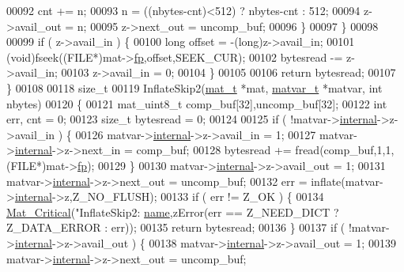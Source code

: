 \begin{DoxyCode}
{{00092             cnt         += n;
00093             n            = ((nbytes-cnt)<512) ? nbytes-cnt : 512;
00094             z->avail\_out = n;
00095             z->next\_out  = uncomp\_buf;
00096         \}
00097     \}
00098 
00099     \textcolor{keywordflow}{if} ( z->avail\_in ) \{
00100         \textcolor{keywordtype}{long} offset = -(long)z->avail\_in;
00101         (\textcolor{keywordtype}{void})fseek((FILE*)mat->\hyperlink{struct__mat__t_a85f562e407ca9ad4d2a6e14f839432b7}{fp},offset,SEEK\_CUR);
00102         bytesread -= z->avail\_in;
00103         z->avail\_in = 0;
00104     \}
00105 
00106     \textcolor{keywordflow}{return} bytesread;
00107 \}
00108 
00118 \textcolor{keywordtype}{size\_t}
00119 InflateSkip2(\hyperlink{struct__mat__t}{mat\_t} *mat, \hyperlink{group___m_a_t_structmatvar__t}{matvar\_t} *matvar, \textcolor{keywordtype}{int} nbytes)
00120 \{
00121     mat\_uint8\_t comp\_buf[32],uncomp\_buf[32];
00122     \textcolor{keywordtype}{int}    err, cnt = 0;
00123     \textcolor{keywordtype}{size\_t} bytesread = 0;
00124 
00125     \textcolor{keywordflow}{if} ( !matvar->\hyperlink{group___m_a_t_a6e97e3ed9f40c49322c18561c2a94e92}{internal}->z->avail\_in ) \{
00126         matvar->\hyperlink{group___m_a_t_a6e97e3ed9f40c49322c18561c2a94e92}{internal}->z->avail\_in = 1;
00127         matvar->\hyperlink{group___m_a_t_a6e97e3ed9f40c49322c18561c2a94e92}{internal}->z->next\_in = comp\_buf;
00128         bytesread += fread(comp\_buf,1,1,(FILE*)mat->\hyperlink{struct__mat__t_a85f562e407ca9ad4d2a6e14f839432b7}{fp});
00129     \}
00130     matvar->\hyperlink{group___m_a_t_a6e97e3ed9f40c49322c18561c2a94e92}{internal}->z->avail\_out = 1;
00131     matvar->\hyperlink{group___m_a_t_a6e97e3ed9f40c49322c18561c2a94e92}{internal}->z->next\_out = uncomp\_buf;
00132     err = inflate(matvar->\hyperlink{group___m_a_t_a6e97e3ed9f40c49322c18561c2a94e92}{internal}->z,Z\_NO\_FLUSH);
00133     \textcolor{keywordflow}{if} ( err != Z\_OK ) \{
00134         \hyperlink{group__mat__util_gaf51f2bfbb5580f575e4dd79757e2b80c}{Mat\_Critical}(\textcolor{stringliteral}{"InflateSkip2: %
      \hyperlink{group___m_a_t_a5d4b55b041e3b4fb50c04337f05ad909}{name},zError(err == Z\_NEED\_DICT ? Z\_DATA\_ERROR : err));
00135         \textcolor{keywordflow}{return} bytesread;
00136     \}
00137     \textcolor{keywordflow}{if} ( !matvar->\hyperlink{group___m_a_t_a6e97e3ed9f40c49322c18561c2a94e92}{internal}->z->avail\_out ) \{
00138         matvar->\hyperlink{group___m_a_t_a6e97e3ed9f40c49322c18561c2a94e92}{internal}->z->avail\_out = 1;
00139         matvar->\hyperlink{group___m_a_t_a6e97e3ed9f40c49322c18561c2a94e92}{internal}->z->next\_out = uncomp\_buf;
}}}
\end{DoxyCode}
